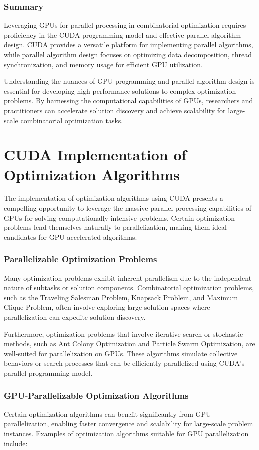 \documentclass[11pt]{report}
\begin{document}
        \subsubsection{Summary}
        Leveraging GPUs for parallel processing in combinatorial optimization requires proficiency in the CUDA programming model and effective parallel algorithm design. CUDA provides a versatile platform for implementing parallel algorithms, while parallel algorithm design focuses on optimizing data decomposition, thread synchronization, and memory usage for efficient GPU utilization.

        Understanding the nuances of GPU programming and parallel algorithm design is essential for developing high-performance solutions to complex optimization problems. By harnessing the computational capabilities of GPUs, researchers and practitioners can accelerate solution discovery and achieve scalability for large-scale combinatorial optimization tasks.

    \section{CUDA Implementation of Optimization Algorithms}
        The implementation of optimization algorithms using CUDA presents a compelling opportunity to leverage the massive parallel processing capabilities of GPUs for solving computationally intensive problems. Certain optimization problems lend themselves naturally to parallelization, making them ideal candidates for GPU-accelerated algorithms.
        \subsubsection{Parallelizable Optimization Problems}
        Many optimization problems exhibit inherent parallelism due to the independent nature of subtasks or solution components. Combinatorial optimization problems, such as the Traveling Salesman Problem, Knapsack Problem, and Maximum Clique Problem, often involve exploring large solution spaces where parallelization can expedite solution discovery.

        Furthermore, optimization problems that involve iterative search or stochastic methods, such as Ant Colony Optimization and Particle Swarm Optimization, are well-suited for parallelization on GPUs. These algorithms simulate collective behaviors or search processes that can be efficiently parallelized using CUDA's parallel programming model.
        \subsubsection{GPU-Parallelizable Optimization Algorithms}
        Certain optimization algorithms can benefit significantly from GPU parallelization, enabling faster convergence and scalability for large-scale problem instances. Examples of optimization algorithms suitable for GPU parallelization include:
\end{document}
